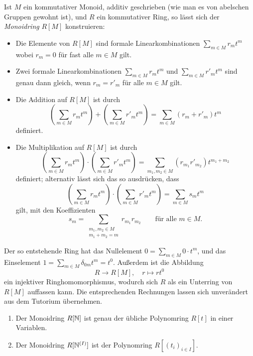 Ist $M$ ein kommutativer Monoid, additiv geschrieben (wie man es von abelschen Gruppen gewohnt ist), und $R$ ein kommutativer Ring, so lässt sich der \emph{Monoidring} $R[M]$ konstruieren:
\begin{itemize}
  \item
    Die Elemente von $R[M]$ sind formale Linearkombinationen $\sum_{m \in M} r_m t^m$ wobei $r_m = 0$ für fast alle $m \in M$ gilt.
  \item
    Zwei formale Linearkombinationen $\sum_{m \in M} r_m t^m$ und $\sum_{m \in M} r'_m t^m$ sind genau dann gleich, wenn $r_m = r'_m$ für alle $m \in M$ gilt.
  \item
    Die Addition auf $R[M]$ ist durch
    \[
        \left( \sum_{m \in M} r_m t^m \right) + \left( \sum_{m \in M} r'_m t^m \right)
      = \sum_{m \in M} (r_m + r'_m) t^m
    \]
    definiert.
  \item
    Die Multiplikation auf $R[M]$ ist durch
    \[
        \left( \sum_{m \in M} r_m t^m \right) \cdot \left( \sum_{m \in M} r'_m t^m \right)
      = \sum_{m_1, m_2 \in M} (r_{m_1} r'_{m_2}) t^{m_1 + m_2}
    \]
    definiert;
    alternativ lässt sich das so ausdrücken, dass
    \[
        \left( \sum_{m \in M} r_m t^m \right) \cdot \left( \sum_{m \in M} r'_m t^m \right)
      = \sum_{m \in M} s_m t^m
    \]
    gilt, mit den Koeffizienten
    \[
        s_m
      = \sum_{\substack{m_1, m_2 \in M \\ m_1 + m_2 = m}} r_{m_1} r_{m_2}
      \qquad
      \text{für alle $m \in M$}.
    \]
\end{itemize}

Der so entstehende Ring hat das Nullelement $0 = \sum_{m \in M} 0 \cdot t^m$, und das Einselement $1 = \sum_{m \in M} \delta_{0m} t^m = t^0$.
Außerdem ist die Abbildung
\[
          R
  \to     R[M],
  \quad   r
  \mapsto r t^0
\]
ein injektiver Ringhomomorphismus, wodurch sich $R$ als ein Unterring von $R[M]$ auffassen kann.
Die entsprechenden Rechnungen lassen sich unverändert aus dem Tutorium übernehmen.

\begin{example}
  \leavevmode
  \begin{enumerate}
    \item
      Der Monoidring $R[\mathbb{N}]$ ist genau der übliche Polynomring $R[t]$ in einer Variablen.
    \item
      Der Monoidring $R[\mathbb{N}^{(I)}]$ ist der Polynomring $R[(t_i)_{i \in I}]$.
  \end{enumerate}
\end{example}

